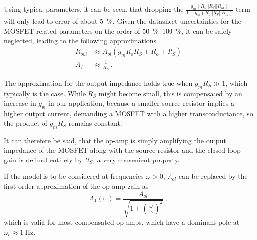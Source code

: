 \documentclass[12pt]{book}
\begin{document}
Using typical parameters, it can be seen, that dropping the $\frac{g_m \left(R_o || R_S || R_{id}\right)}{1 + g_m \left(R_o || R_S || R_{id}\right)}$ term will only lead to error of about \qty{5}{\percent}. Given the datasheet uncertainties for the MOSFET related parameters on the order of \qtyrange{50}{100}{\percent}, it can be safely neglected, leading to the following approximations
\begin{align}
    R_{out} &\approx A_{ol} \left(g_m R_o R_S + R_o + R_S \right)\\
    A_f &\approx \frac{1}{R_S} \,. \nonumber
\end{align}

The approximation for the output impedance holds true when $g_m R_S \gg 1$, which typically is the case. While $R_S$ might become small, this is compensated by an increase in $g_m$ in our application, because a smaller source resistor implies a higher output current, demanding a MOSFET with a higher transconductance, so the product of $g_m R_S$ remains constant.

It can therefore be said, that the op-amp is simply amplifying the output impedance of the MOSFET along with the source resistor and the closed-loop gain is defined entirely by $R_S$, a very convenient property.

If the model is to be considered at frequencies $\omega > 0$, $A_{ol}$ can be replaced by the first order approximation of the op-amp gain as
\begin{equation}
    A_1 (\omega) = \frac{A_{ol}}{\sqrt{1 + \left(\frac{\omega}{\omega_c}\right)^2}}\,,
\end{equation}
which is valid for most compensated op-amps, which have a dominant pole at $\omega_c \approx \qty{1}{\Hz}$.
\end{document}
